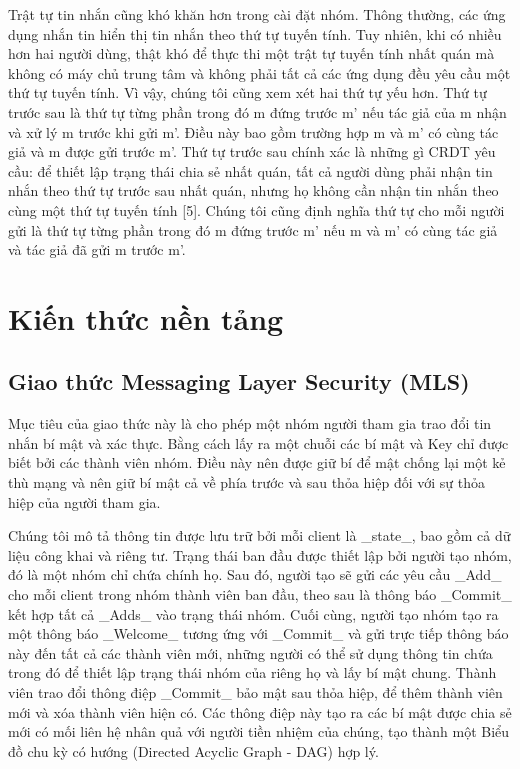 \documentclass[../main-report.tex]{subfiles}
\begin{document}
Trật tự tin nhắn cũng khó khăn hơn trong cài đặt nhóm. Thông thường, các ứng dụng nhắn tin hiển thị tin nhắn theo thứ tự tuyến tính. Tuy nhiên, khi có nhiều hơn hai người dùng, thật khó để thực thi một trật tự tuyến tính nhất quán mà không có máy chủ trung tâm và không phải tất cả các ứng dụng đều yêu cầu một thứ tự tuyến tính. Vì vậy, chúng tôi cũng xem xét hai thứ tự yếu hơn. Thứ tự trước sau là thứ tự từng phần trong đó m đứng trước m’ nếu tác giả của m nhận và xử lý m trước khi gửi m’. Điều này bao gồm trường hợp m và m’ có cùng tác giả và m được gửi trước m’. Thứ tự trước sau chính xác là những gì CRDT yêu cầu: để thiết lập trạng thái chia sẻ nhất quán, tất cả người dùng phải nhận tin nhắn theo thứ tự trước sau nhất quán, nhưng họ không cần nhận tin nhắn theo cùng một thứ tự tuyến tính [5]. Chúng tôi cũng định nghĩa thứ tự cho mỗi người gửi là thứ tự từng phần trong đó m đứng trước m’ nếu m và m’ có cùng tác giả và tác giả đã gửi m trước m’.

\section{Kiến thức nền tảng}
\subsection{Giao thức Messaging Layer Security (MLS)}

Mục tiêu của giao thức này là cho phép một nhóm người tham gia trao đổi tin nhắn bí mật và xác thực. Bằng cách lấy ra một chuỗi các bí mật và Key chỉ được biết bởi các thành viên nhóm. Điều này nên được giữ bí để mật chống lại một kẻ thù mạng và nên giữ bí mật cả về phía trước và sau thỏa hiệp đối với sự thỏa hiệp của người tham gia.

Chúng tôi mô tả thông tin được lưu trữ bởi mỗi client là \_state\_, bao gồm cả dữ liệu công khai và riêng tư. Trạng thái ban đầu được thiết lập bởi người tạo nhóm, đó là một nhóm chỉ chứa chính họ. Sau đó, người tạo sẽ gửi các yêu cầu \_Add\_ cho mỗi client trong nhóm thành viên ban đầu, theo sau là thông báo \_Commit\_ kết hợp tất cả \_Adds\_ vào trạng thái nhóm. Cuối cùng, người tạo nhóm tạo ra một thông báo \_Welcome\_ tương ứng với \_Commit\_ và gửi trực tiếp thông báo này đến tất cả các thành viên mới, những người có thể sử dụng thông tin chứa trong đó để thiết lập trạng thái nhóm của riêng họ và lấy bí mật chung. Thành viên trao đổi thông điệp \_Commit\_ bảo mật sau thỏa hiệp, để thêm thành viên mới và xóa thành viên hiện có. Các thông điệp này tạo ra các bí mật được chia sẻ mới có mối liên hệ nhân quả với người tiền nhiệm của chúng, tạo thành một Biểu đồ chu kỳ có hướng (Directed Acyclic Graph - DAG) hợp lý. 
\end{document}
